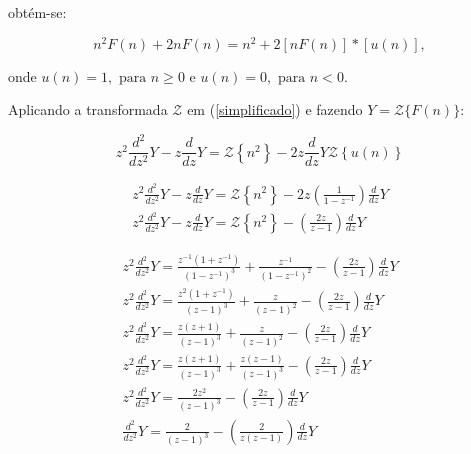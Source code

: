 \documentclass[a4paper,10pt]{article}
\begin{document}
obtém-se:


\begin{equation}
n^2 F(n)  +2nF(n) =  n^2  + 2 \left[ nF(n) \right] * \left[ u(n) \right],
\label{simplificado}
\end{equation}

onde $u(n) = 1, \mbox{ para } n \geq 0$ e $u(n) = 0, \mbox{ para } n < 0$.


Aplicando a transformada  $\mathcal{Z}$ em (\ref{simplificado}) e fazendo $ Y = \mathcal{Z} \{ F(n) \} $:

$$
 z^2 \displaystyle \frac{d^2}{dz^2}Y - z \displaystyle \frac{d}{dz}Y = \mathcal{Z} \left\{ n^2  \right\} - 2 z  
 \displaystyle \frac{d}{dz}Y \mathcal{Z} \left\{u(n)\right\}
$$

$$
\begin{array}{lcl} 
 z^2 \displaystyle \frac{d^2}{dz^2}Y - z \displaystyle \frac{d}{dz}Y= \mathcal{Z} \left\{ n^2 \right\} - 2 z   
 \left( \displaystyle \frac{1}{1 - z^{-1}} \right) \displaystyle \frac{d}{dz}Y \\
 z^2 \displaystyle \frac{d^2}{dz^2}Y - z \displaystyle \frac{d}{dz}Y = \mathcal{Z} \left\{ n^2  \right\} -  \left( \displaystyle \frac{2z}{z - 1} \right) \displaystyle \frac{d}{dz}Y
\end{array}  
$$

$$
\begin{array}{lcl} 
z^2 \displaystyle \frac{d^2}{dz^2}Y = \frac{z^{-1} (1 + z^{-1})}{(1 - z^{-1})^3} + 
 \frac{z^{-1}}{(1 - z^{-1})^2} -  \left( \displaystyle \frac{2z}{z - 1} \right) \displaystyle \frac{d}{dz}Y \\
 z^2 \displaystyle \frac{d^2}{dz^2}Y = \frac{z^2 (1 + z^{-1})}{(z - 1)^3} + 
 \frac{z}{(z - 1)^2} -  \left( \displaystyle \frac{2z}{z - 1} \right) \displaystyle \frac{d}{dz}Y \\
 z^2 \displaystyle \frac{d^2}{dz^2}Y = \frac{z(z + 1)}{(z - 1)^3} + 
 \frac{z}{(z - 1)^2} -  \left( \displaystyle \frac{2z}{z - 1} \right) \displaystyle \frac{d}{dz}Y \\
 z^2 \displaystyle \frac{d^2}{dz^2}Y = \frac{z(z + 1)}{(z - 1)^3} + 
 \frac{z(z - 1)}{(z - 1)^3} -  \left( \displaystyle \frac{2z}{z - 1} \right) \displaystyle \frac{d}{dz}Y \\
 z^2 \displaystyle \frac{d^2}{dz^2}Y = \frac{2z^2}{(z - 1)^3} -  \left( \displaystyle \frac{2z}{z - 1} \right) \displaystyle \frac{d}{dz}Y \\
 \displaystyle \frac{d^2}{dz^2}Y = \frac{2}{(z - 1)^3} -  \left( \displaystyle \frac{2}{z(z - 1)} \right) \displaystyle \frac{d}{dz}Y \\
\end{array}  
$$
\end{document}
